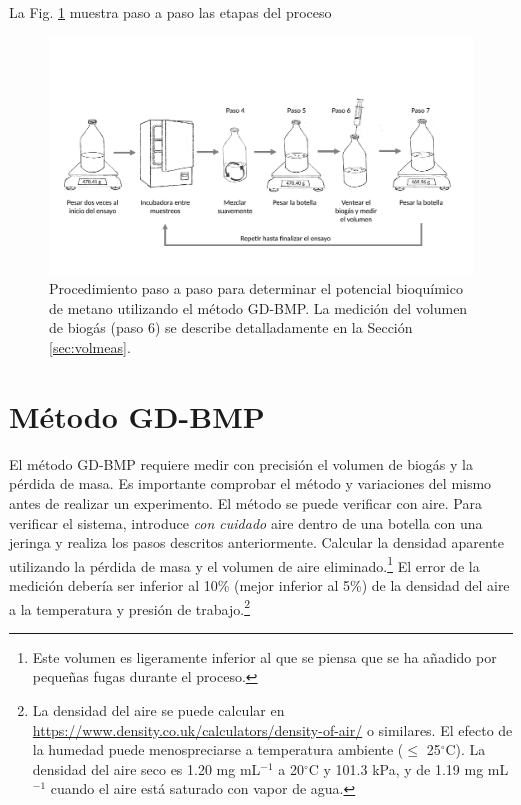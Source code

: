 \documentclass[]{article}
\begin{document}
La Fig. \ref{fig:steps} muestra paso a paso las etapas del proceso

\begin{figure}[ht]
  \includegraphics[width=\textwidth]{figs/GD_steps_ES.pdf}
  \caption{Procedimiento paso a paso para determinar el potencial bioquímico de metano utilizando el método GD-BMP. La medición del volumen de biogás (paso 6) se describe detalladamente en la Sección \ref{sec:volmeas}.}
  \label{fig:steps}
\end{figure}


\section{Método GD-BMP}
El método GD-BMP requiere medir con precisión el volumen de biogás y la pérdida de masa.
Es importante comprobar el método y variaciones del mismo antes de realizar un experimento.
El método se puede verificar con aire.
Para verificar el sistema, introduce \textit{con cuidado} aire dentro de una botella con una jeringa y realiza los pasos descritos anteriormente. 
Calcular la densidad aparente utilizando la pérdida de masa y el volumen de aire eliminado.\footnote{Este volumen es ligeramente inferior al que se piensa que se ha añadido por pequeñas fugas durante el proceso.}
El error de la medición debería ser inferior al 10\% (mejor inferior al 5\%) de la densidad del aire a la temperatura y presión de trabajo.\footnote{La densidad del aire se puede calcular en  \url{https://www.density.co.uk/calculators/density-of-air/} o similares. El efecto de la humedad puede menospreciarse a temperatura ambiente ($\le$ 25$^\circ$C). La densidad del aire seco es 1.20 mg mL$^{-1}$ a 20$^\circ$C y 101.3 kPa, y de 1.19 mg mL$^{-1}$ cuando el aire está saturado con vapor de agua.}
\end{document}
